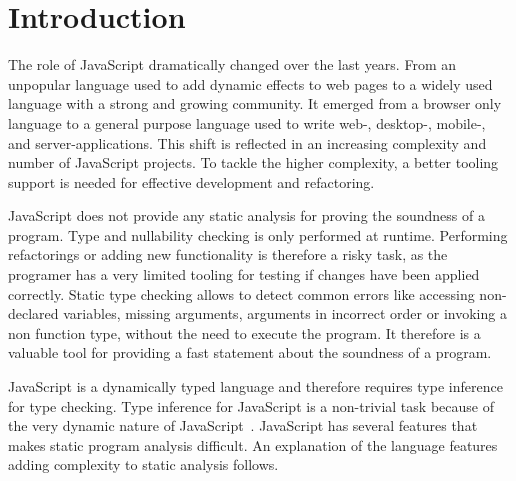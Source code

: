 \section{Introduction}\label{sec:introduction}
The role of JavaScript dramatically changed over the last years. From an unpopular language used to add dynamic effects to web pages to a widely used language with a strong and growing community. It emerged from a browser only language to a general purpose language used to write web-,  desktop-, mobile-, and server-applications. This shift is reflected in an increasing complexity and number of JavaScript projects. To tackle the higher complexity, a better tooling support is needed for effective development and refactoring.  

JavaScript does not provide any static analysis for proving the soundness of a program. Type and nullability checking is only performed at runtime. Performing refactorings or adding new functionality is therefore a risky task, as the programer has a very limited tooling for testing if changes have been applied correctly. Static type checking allows to detect common errors like accessing non-declared variables, missing arguments, arguments in incorrect order or invoking a non function type, without the need to execute the program. It therefore is a valuable tool for providing a fast statement about the soundness of a program.

JavaScript is a dynamically typed language and therefore requires type inference for type checking. Type inference for JavaScript is a non-trivial task because of the very dynamic nature of JavaScript~\cite{JensenMollerThiemann2009}. JavaScript has several features that makes static program analysis difficult. An explanation of the language features adding complexity to static analysis follows.

